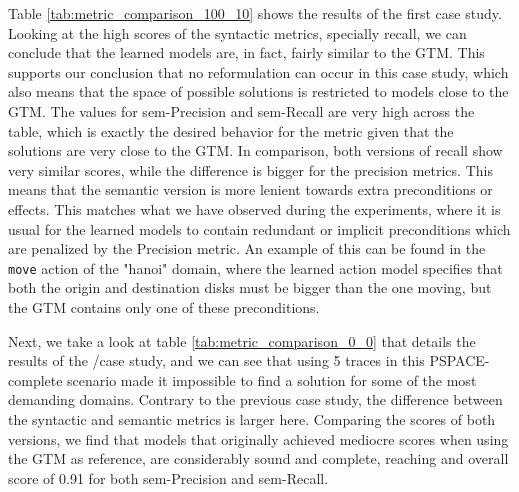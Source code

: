 Table \ref{tab:metric_comparison_100_10} shows the results of the first case study. Looking at the high scores of the syntactic metrics, specially recall, we can conclude that the learned models are, in fact, fairly similar to the GTM. This supports our conclusion that no reformulation can occur in this case study, which also means that the space of possible solutions is restricted to models close to the GTM. The values for sem-Precision and sem-Recall are very high across the table, which is exactly the desired behavior for the metric given that the solutions are very close to the GTM. In comparison, both versions of recall show very similar scores, while the difference is bigger for the precision metrics. This means that the semantic version is more lenient towards extra preconditions or effects. This matches what we have observed during the experiments, where it is usual for the learned models to contain redundant or implicit preconditions which are penalized by the Precision metric. An example of this can be found in the {\tt move} action of the "hanoi" domain, where the learned action model specifies that both the origin and destination disks must be bigger than the one moving, but the GTM contains only one of these preconditions.

Next, we take a look at table \ref{tab:metric_comparison_0_0} that details the results of the \NO/\NO case study, and we can see that using 5 traces in this PSPACE-complete scenario made it impossible to find a solution for some of the most demanding domains. Contrary to the previous case study, the difference between the syntactic and semantic metrics is larger here. Comparing the scores of both versions, we find that models that originally achieved mediocre scores when using the GTM as reference, are considerably sound and complete, reaching and overall score of 0.91 for both sem-Precision and sem-Recall.


